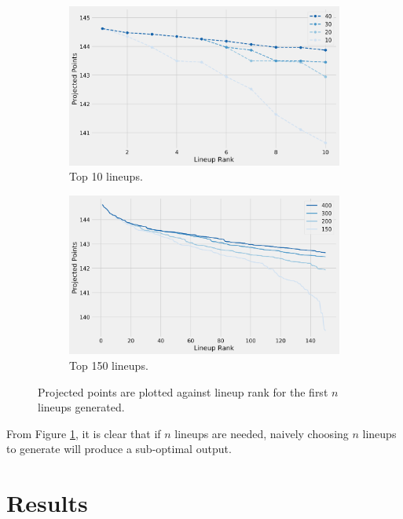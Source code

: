 \documentclass[12pt]{article}
\begin{document}
\begin{figure}[H]
  \centering
  \begin{subfigure}[b]{0.80\textwidth}
    \centering
    \includegraphics[width=1\textwidth]{../figures/lineups10_vs_n}
    \caption{Top 10 lineups.}
  \end{subfigure}
  \par\bigskip
  \begin{subfigure}[b]{0.80\textwidth}
    \centering
    \includegraphics[width=1\textwidth]{../figures/lineups150_vs_n}
    \caption{Top 150 lineups.}
  \end{subfigure}
  \caption{Projected points are plotted against lineup rank for the first $n$ lineups generated.}
\label{lineups_vs_n}
\end{figure}

From Figure \ref{lineups_vs_n}, it is clear that if $n$ lineups are needed, naively choosing $n$ lineups to generate will produce a sub-optimal output.

\pagebreak
\section{Results}
\end{document}
